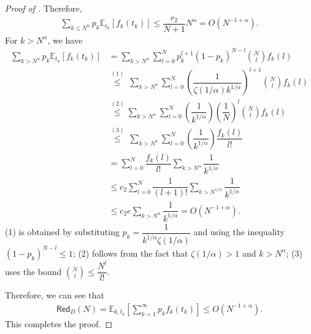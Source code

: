 \documentclass[11pt]{article}
\theoremstyle{plain}
\newtheorem{theorem}{Theorem}[section]
\theoremstyle{definition}
\newcommand{\testdataerror}{\mathsf{Red}_D}
\begin{document}
\begin{proof}[Proof of ]
    Therefore,
    \begin{align*}
        \sum\limits_{k\le N^{\alpha}}p_k\mathbb{E}_{t_k}[f_k(t_k)] \le  \dfrac{c_2}{N+1} N^{\alpha} =O(N^{-1+\alpha}).
    \end{align*}
    For $k>N^{\alpha}$, we have 
    \begin{align*}
        \sum\limits_{k> N^{\alpha}}p_k\mathbb{E}_{t_k}[f_k(t_k)] &= \sum\limits_{k> N^{\alpha}}\sum\limits_{l=0}^N p_k^{l+1} (1-p_k)^{N-l}\binom{N}{l}f_k(l) \\
        &\overset{(1)}{\le}\ \sum\limits_{k> N^{\alpha}}\sum\limits_{l=0}^N \left(\dfrac{1}{\zeta(1/\alpha)k^{1/\alpha}}\right)^{l+1} \binom{N}{l}f_k(l) \\
        &\overset{(2)}{\le} \sum\limits_{k> N^{\alpha}}\sum\limits_{l=0}^N \left(\dfrac{1}{k^{1/\alpha}}\right)\left(\dfrac{1}{N}\right)^l \binom{N}{l}f_k(l) \\
        &\overset{(3)}{\le}\ \sum\limits_{k> N^{\alpha}}\sum\limits_{l=0}^N \left(\dfrac{1}{k^{1/\alpha}}\right)\dfrac{f_k(l)}{l!}  
        \\&= \sum\limits_{l=0}^N \dfrac{f_k(l)}{l!} \sum\limits_{k> N^{\alpha}}\dfrac{1}{k^{1/\alpha}}
        \\ &\le c_2\sum\limits_{l=0}^N \dfrac{1}{(l+1)!} \sum\limits_{k> N^{1/\alpha}}\dfrac{1}{k^{1/\alpha}}
        \\ &\le c_2e\sum\limits_{k> N^{\alpha}}\dfrac{1}{k^{1/\alpha}} 
        = O(N^{-1+\alpha}).
    \end{align*}
    (1) is obtained by substituting $p_k=\dfrac{1}{k^{1/\alpha}\zeta(1/\alpha)}$ and using the inequality $(1 - p_k)^{N-l} \le 1$; (2) follows from the fact that $\zeta(1/\alpha) > 1$ and $k > N^{\alpha}$; (3) uses the bound $\binom{N}{l} \le \dfrac{N^l}{l!}$.

    Therefore, we can see that
    \begin{align*}
   \testdataerror(N)=\mathbb{E}_{k,t_k}
   \left[\sum\limits_{k=1}^{\infty}p_kf_k(t_k) \right]\le O(N^{-1+\alpha}).
    \end{align*}
This completes the proof.   
\end{proof}


\end{document}
